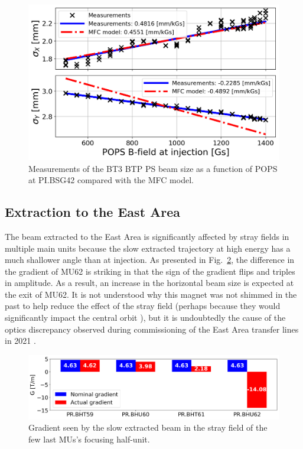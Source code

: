 \begin{figure}[!htb]
   \centering
   \includegraphics*[width=0.7\columnwidth]{01_Introduction/images/injection_measurement_beam_size.png}
   \caption{Measurements of the BT3 BTP PS beam size as a function of POPS at PI.BSG42 compared with the MFC model.}
   \label{fig:injection_btp_beam_size}
\end{figure}

\subsection{Extraction to the East Area}
The beam extracted to the East Area is significantly affected by stray fields in multiple main units because the slow extracted trajectory at high energy has a much shallower angle than at injection. As presented in Fig.~\ref{fig:stray field gradients}, the difference in the gradient of MU62 is striking in that the sign of the gradient flips and triples in amplitude. As a result, an increase in the horizontal beam size is expected at the exit of MU62. It is not understood why this magnet was not shimmed in the past to help reduce the effect of the stray field (perhaps because they would significantly impact the central orbit \cite{Zickler:private}), but it is undoubtedly the cause of the optics discrepancy observed during commissioning of the East Area transfer lines in 2021 \cite{huschauer:ipac22-mopost006}.

\begin{figure}[!htb]
   \centering
   \includegraphics*[width=0.7\columnwidth]{01_Introduction/images/gradient_stray_field.png}
   \caption{Gradient seen by the slow extracted beam in the stray field of the few last MUs's focusing half-unit.}
   \label{fig:stray field gradients}
\end{figure}


